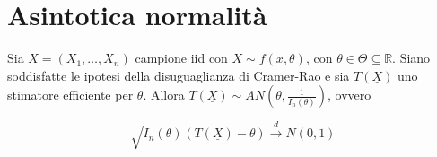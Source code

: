 \documentclass[hidelinks, 10pt]{report}
\begin{document}
\section{Asintotica normalit\`a}

\begin{prop}
Sia $ \underline{X} = (X_1, \dotsc, X_n) $ campione iid con $ \underline{X} \sim f(\underline{x}, \theta) $, con $ \theta \in \Theta \subseteq \mathbb{R} $. Siano soddisfatte le ipotesi della disuguaglianza di Cramer-Rao e sia $ T(\underline{X}) $ uno stimatore efficiente per $ \theta $. Allora $ T(\underline{X}) \sim AN \left( \theta, \frac{1}{I_{n} (\theta)} \right) $, ovvero

\[ \sqrt{I_{n} (\theta)} (T(\underline{X}) - \theta) \stackrel{d}{\to} N(0,1) \]
\end{prop}
\end{document}

